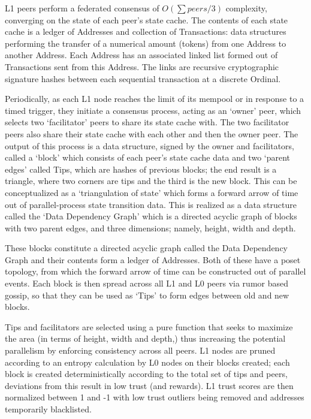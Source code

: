 \documentclass{article}
\begin{document}
L1 peers perform a federated consensus of $O(\sum peers/3)$ complexity, converging on the state of each peer’s state cache. The contents of each state cache is a ledger of Addresses and collection of Transactions: data structures performing the transfer of a numerical amount (tokens) from one Address to another Address. Each Address has an associated linked list formed out of Transactions sent from this Address. The links are recursive cryptographic signature hashes between each sequential transaction at a discrete Ordinal.

Periodically, as each L1 node reaches the limit of its mempool or in response to a timed trigger, they initiate a consensus process, acting as an ‘owner’ peer, which selects two ‘facilitator’ peers to share its state cache with. The two facilitator peers also share their state cache with each other and then the owner peer. The output of this process is a data structure, signed by the owner and facilitators, called a ‘block’ which consists of each peer’s state cache data and two ‘parent edges’ called Tips, which are hashes of previous blocks; the end result is a triangle, where two corners are tips and the third is the new block. This can be conceptualized as a ‘triangulation of state’ which forms a forward arrow of time out of parallel-process state transition data. This is realized as a data structure called the ‘Data Dependency Graph’ which is a directed acyclic graph of blocks with two parent edges, and three dimensions; namely, height, width and depth. 



These blocks constitute a directed acyclic graph called the Data Dependency Graph and their contents form a ledger of Addresses. Both of these have a poset topology, from which the forward arrow of time can be constructed out of parallel events. Each block is then spread across all L1 and L0 peers via rumor based gossip, so that they can be used as ‘Tips’ to form edges between old and new blocks.

Tips and facilitators are selected using a pure function that seeks to maximize the area (in terms of height, width and depth,) thus increasing the potential parallelism by enforcing consistency across all peers. L1 nodes are pruned according to an entropy calculation by L0 nodes on their blocks created; each block is created deterministically according to the total set of tips and peers, deviations from this result in low trust (and rewards). L1 trust scores are then normalized between 1 and -1 with low trust outliers being removed and addresses temporarily blacklisted.
\end{document}
